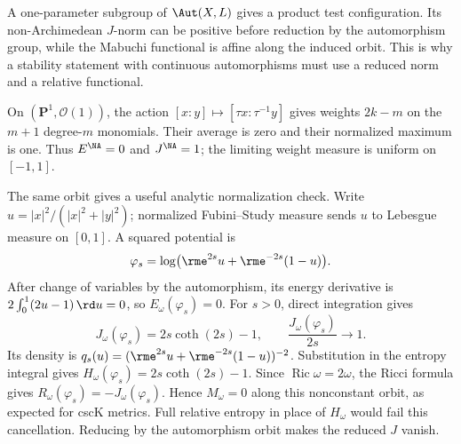 \begin{example}
\label{ex:ytd-product-configuration}
A one-parameter subgroup of $\Aut(X,L)$ gives a product test
configuration. Its non-Archimedean $J$-norm can be positive before
reduction by the automorphism group, while the Mabuchi functional is
affine along the induced orbit. This is why a stability statement with
continuous automorphisms must use a reduced norm and a relative
functional.

On $(\mathbf P^1,\mathcal O(1))$, the action
$[x:y]\mapsto[\tau x:\tau^{-1}y]$ gives weights $2k-m$ on the
$m+1$ degree-$m$ monomials. Their average is zero and their normalized
maximum is one. Thus $E^{\NA}=0$ and $J^{\NA}=1$; the limiting weight
measure is uniform on $[-1,1]$.

The same orbit gives a useful analytic normalization check. Write
$u=|x|^2/(|x|^2+|y|^2)$; normalized Fubini--Study measure sends $u$ to
Lebesgue measure on $[0,1]$. A squared potential is
\[
 \varphi_s=\log\bigl(\rme^{2s}u+\rme^{-2s}(1-u)\bigr).
\]
After change of variables by the automorphism, its energy derivative is
$2\int_0^1(2u-1)\,\rd u=0$, so $E_\omega(\varphi_s)=0$.
For $s>0$, direct integration gives
\[
 J_\omega(\varphi_s)=2s\coth(2s)-1,
 \qquad \frac{J_\omega(\varphi_s)}{2s}\longrightarrow1.
\tag{68.24a}\label{eq:ytd-product-orbit-j}
\]
Its density is $q_s(u)=(\rme^{2s}u+\rme^{-2s}(1-u))^{-2}$.
Substitution in the entropy integral gives
$H_\omega(\varphi_s)=2s\coth(2s)-1$. Since
$\operatorname{Ric}\omega=2\omega$, the Ricci formula gives
$R_\omega(\varphi_s)=-J_\omega(\varphi_s)$. Hence $M_\omega=0$ along
this nonconstant orbit, as expected for cscK metrics. Full relative entropy
in place of $H_\omega$ would fail this cancellation. Reducing by the
automorphism orbit makes the reduced $J$ vanish.
\end{example}

